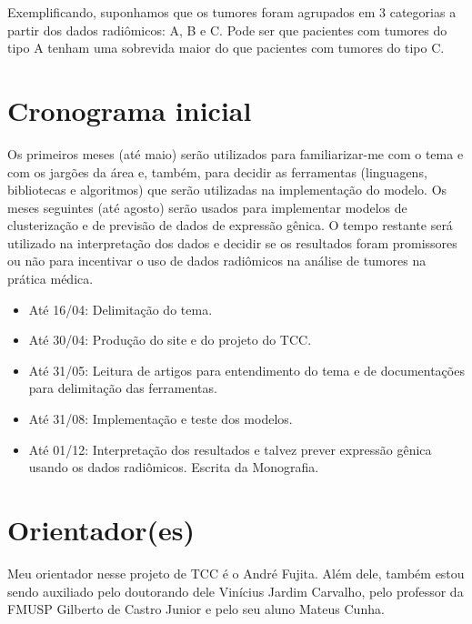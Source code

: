 \documentclass[11pt]{article}
\begin{document}
Exemplificando, suponhamos que os tumores foram agrupados em 3 categorias a partir dos dados radiômicos: A, B e C. Pode ser que pacientes com tumores do tipo A tenham uma sobrevida maior do que pacientes com tumores do tipo C.


\section{Cronograma inicial}
\label{sec:org933e012}

Os primeiros meses (até maio) serão utilizados para familiarizar-me com o tema e com os jargões da área e, também, para decidir as ferramentas (linguagens, bibliotecas e algoritmos) que serão utilizadas na implementação do modelo. 
Os meses seguintes (até agosto) serão usados para implementar modelos de clusterização e de previsão de dados de expressão gênica.
O tempo restante será utilizado na interpretação dos dados e decidir se os resultados foram promissores ou não para incentivar o uso de dados radiômicos na análise de tumores na prática médica.

\begin{itemize}
\item Até 16/04: Delimitação do tema.
\item Até 30/04: Produção do site e do projeto do TCC.
\item Até 31/05: Leitura de artigos para entendimento do tema e de documentações para delimitação das ferramentas.
\item Até 31/08: Implementação e teste dos modelos.
\item Até 01/12: Interpretação dos resultados e talvez prever expressão gênica usando os dados radiômicos. Escrita da Monografia.
\end{itemize}

\section{Orientador(es)}
\label{sec:org2c21b8b}
Meu orientador nesse projeto de TCC é o André Fujita.
Além dele, também estou sendo auxiliado pelo doutorando dele Vinícius Jardim Carvalho, pelo professor da FMUSP Gilberto de Castro Junior e pelo seu aluno Mateus Cunha.		
\end{document}
